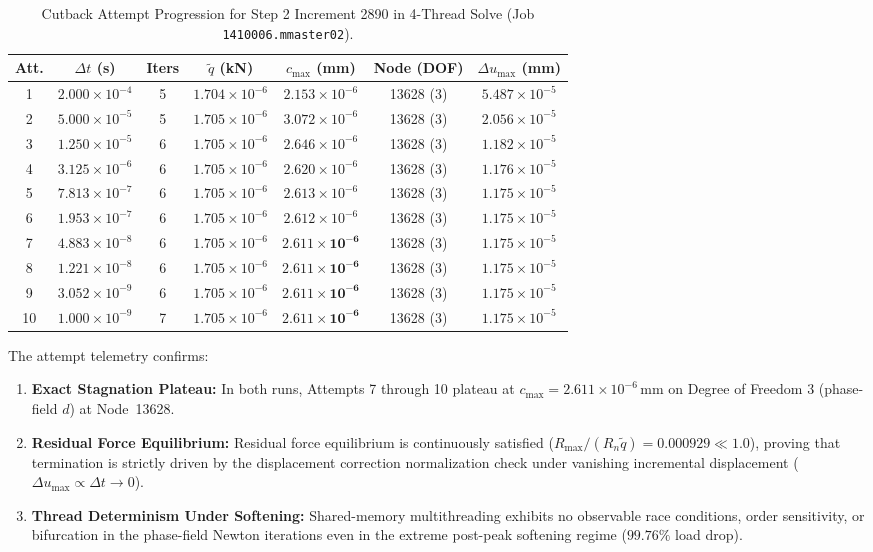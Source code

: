 \begin{table}[htbp]
\centering
\small
\caption{Cutback Attempt Progression for Step 2 Increment 2890 in 4-Thread Solve (Job \texttt{1410006.mmaster02}).}
\label{tab:stage14uaj_attempt_progression}
\begin{tabularx}{\textwidth}{c c c c c c c}
\toprule
\textbf{Att.} & $\Delta t$ (s) & \textbf{Iters} & $\tilde{q}$ (kN) & $c_{\max}$ (mm) & Node (DOF) & $\Delta u_{\max}$ (mm) \\
\midrule
1  & $2.000\times 10^{-4}$ & 5 & $1.704\times 10^{-6}$ & $2.153\times 10^{-6}$ & 13628 (3) & $5.487\times 10^{-5}$ \\
2  & $5.000\times 10^{-5}$ & 5 & $1.705\times 10^{-6}$ & $3.072\times 10^{-6}$ & 13628 (3) & $2.056\times 10^{-5}$ \\
3  & $1.250\times 10^{-5}$ & 6 & $1.705\times 10^{-6}$ & $2.646\times 10^{-6}$ & 13628 (3) & $1.182\times 10^{-5}$ \\
4  & $3.125\times 10^{-6}$ & 6 & $1.705\times 10^{-6}$ & $2.620\times 10^{-6}$ & 13628 (3) & $1.176\times 10^{-5}$ \\
5  & $7.813\times 10^{-7}$ & 6 & $1.705\times 10^{-6}$ & $2.613\times 10^{-6}$ & 13628 (3) & $1.175\times 10^{-5}$ \\
6  & $1.953\times 10^{-7}$ & 6 & $1.705\times 10^{-6}$ & $2.612\times 10^{-6}$ & 13628 (3) & $1.175\times 10^{-5}$ \\
7  & $4.883\times 10^{-8}$ & 6 & $1.705\times 10^{-6}$ & $\mathbf{2.611\times 10^{-6}}$ & 13628 (3) & $1.175\times 10^{-5}$ \\
8  & $1.221\times 10^{-8}$ & 6 & $1.705\times 10^{-6}$ & $\mathbf{2.611\times 10^{-6}}$ & 13628 (3) & $1.175\times 10^{-5}$ \\
9  & $3.052\times 10^{-9}$ & 6 & $1.705\times 10^{-6}$ & $\mathbf{2.611\times 10^{-6}}$ & 13628 (3) & $1.175\times 10^{-5}$ \\
10 & $1.000\times 10^{-9}$ & 7 & $1.705\times 10^{-6}$ & $\mathbf{2.611\times 10^{-6}}$ & 13628 (3) & $1.175\times 10^{-5}$ \\
\bottomrule
\end{tabularx}
\end{table}

The attempt telemetry confirms:
\begin{enumerate}
  \item \textbf{Exact Stagnation Plateau:} In both runs, Attempts 7 through 10 plateau at $c_{\max} = 2.611\times 10^{-6}\,\mathrm{mm}$ on Degree of Freedom 3 (phase-field $d$) at Node~13628.
  \item \textbf{Residual Force Equilibrium:} Residual force equilibrium is continuously satisfied ($R_{\max} / (R_n \tilde{q}) = 0.000929 \ll 1.0$), proving that termination is strictly driven by the displacement correction normalization check under vanishing incremental displacement ($\Delta u_{\max} \propto \Delta t \to 0$).
  \item \textbf{Thread Determinism Under Softening:} Shared-memory multithreading exhibits no observable race conditions, order sensitivity, or bifurcation in the phase-field Newton iterations even in the extreme post-peak softening regime ($99.76\%$ load drop).
\end{enumerate}

